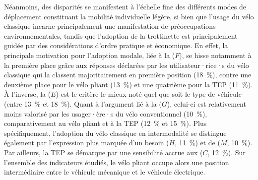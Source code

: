 \begin{refsegment}
Néanmoins, des disparités se manifestent à l'échelle fine des différents modes de déplacement constituant la mobilité individuelle légère, si bien que l'usage du vélo classique incarne principalement une manifestation de préoccupations environnementales, tandis que l'adoption de la trottinette est principalement guidée par des considérations d'ordre pratique et économique. En effet, la principale motivation pour l'adoption modale, liée à la  (\(F\)), se hisse notamment à la première place grâce aux réponses déclarées par les utilisateur·rice·s du vélo classique qui la classent majoritairement en première position (18~\%), contre une deuxième place pour le vélo pliant (13~\%) et une quatrième pour la \acrshort{TEP} (11~\%). À l'inverse, la  (\(E\)) est le critère le mieux noté quel que soit le type de véhicule (entre 13~\% et 18~\%). Quant à l'argument lié à la  (\(G\)), celui-ci est relativement moins valorisé par les usager·ère·s du vélo conventionnel (10~\%), comparativement au vélo pliant et à la \acrshort{TEP} (12~\% et 15~\%). Plus spécifiquement, l'adoption du vélo classique en intermodalité se distingue également par l'expression plus marquée d'un besoin  (\(H\), 11~\%) et de  (\(M\), 10~\%). Par ailleurs, la \acrshort{TEP} se démarque par une sensibilité accrue aux  (\(C\), 12~\%). Sur l'ensemble des indicateurs étudiés, le vélo pliant occupe alors une position intermédiaire entre le véhicule mécanique et le véhicule électrique.%


\end{refsegment}
